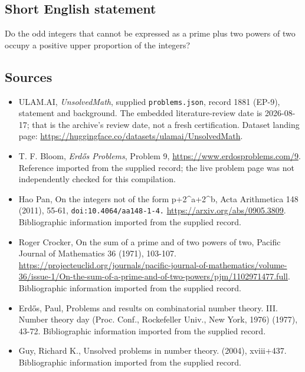 \documentclass[11pt,a4paper]{article}
\begin{document}
\subsection{Short English statement}

Do the odd integers that cannot be expressed as a prime plus two powers of two occupy a positive upper proportion of the integers?

\subsection{Sources}

{\small

\begin{itemize}

\item[\hypertarget{source:1881:1}{S1}] ULAM.AI, \emph{UnsolvedMath}, supplied \texttt{problems.json}, record 1881 (EP-9), statement and background. The embedded literature-review date is 2026-08-17; that is the archive’s review date, not a fresh certification. Dataset landing page: \url{https://huggingface.co/datasets/ulamai/UnsolvedMath}.

\item[\hypertarget{source:1881:2}{S2}] T. F. Bloom, \emph{Erdős Problems}, Problem 9, \url{https://www.erdosproblems.com/9}. Reference imported from the supplied record; the live problem page was not independently checked for this compilation.

\item[\hypertarget{source:1881:3}{S3}] Hao Pan, On the integers not of the form p+2\textasciicircum{}a+2\textasciicircum{}b, Acta Arithmetica 148 (2011), 55-61, \nolinkurl{doi:10.4064/aa148-1-4.} \url{https://arxiv.org/abs/0905.3809}. Bibliographic information imported from the supplied record.

\item[\hypertarget{source:1881:4}{S4}] Roger Crocker, On the sum of a prime and of two powers of two, Pacific Journal of Mathematics 36 (1971), 103-107. \url{https://projecteuclid.org/journals/pacific-journal-of-mathematics/volume-36/issue-1/On-the-sum-of-a-prime-and-of-two-powers/pjm/1102971477.full}. Bibliographic information imported from the supplied record.

\item[\hypertarget{source:1881:5}{S5}] Erd\H{o}s, Paul, Problems and results on combinatorial number theory. III. Number theory day (Proc. Conf., Rockefeller Univ., New York, 1976) (1977), 43-72. Bibliographic information imported from the supplied record.

\item[\hypertarget{source:1881:6}{S6}] Guy, Richard K., Unsolved problems in number theory. (2004), xviii+437. Bibliographic information imported from the supplied record.

\end{itemize}

}

\label{end:1881}
\end{document}
